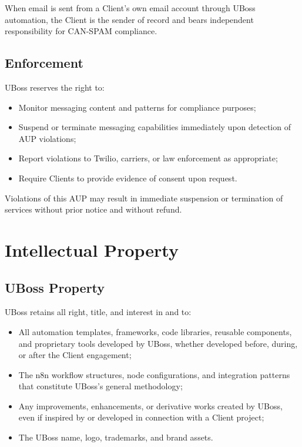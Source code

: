 \documentclass[11pt,letterpaper,parskip=half]{scrartcl}
\begin{document}
When email is sent from a Client's own email account through UBoss automation, the Client is the sender of record and bears independent responsibility for CAN-SPAM compliance.

\subsection{Enforcement}

UBoss reserves the right to:

\begin{itemize}[nosep, leftmargin=1.5em]
    \item Monitor messaging content and patterns for compliance purposes;
    \item Suspend or terminate messaging capabilities immediately upon detection of AUP violations;
    \item Report violations to Twilio, carriers, or law enforcement as appropriate;
    \item Require Clients to provide evidence of consent upon request.
\end{itemize}

Violations of this AUP may result in immediate suspension or termination of services without prior notice and without refund.

\section{Intellectual Property}

\subsection{UBoss Property}

UBoss retains all right, title, and interest in and to:

\begin{itemize}[nosep, leftmargin=1.5em]
    \item All automation templates, frameworks, code libraries, reusable components, and proprietary tools developed by UBoss, whether developed before, during, or after the Client engagement;
    \item The n8n workflow structures, node configurations, and integration patterns that constitute UBoss's general methodology;
    \item Any improvements, enhancements, or derivative works created by UBoss, even if inspired by or developed in connection with a Client project;
    \item The UBoss name, logo, trademarks, and brand assets.
\end{itemize}
\end{document}

